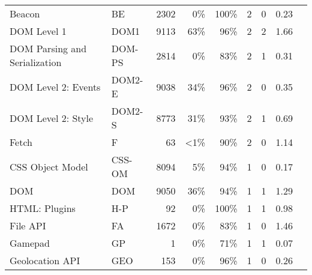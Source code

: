 \begin{table}[ht]
{\begin{tabular}{ l | l r r r | r r | r | l }
      Beacon                                              &  BE          & 2302  & 0\%          & 100\% & 2   & 0  & 0.23  & \\ %
      DOM Level 1                                         &  DOM1        & 9113  & 63\%         & 96\%  & 2   & 2  & 1.66  & \\ %
      DOM Parsing and Serialization                       &  DOM-PS      & 2814  & 0\%          & 83\%  & 2   & 1  & 0.31  & \\ %
      DOM Level 2: Events                                 &  DOM2-E      & 9038  & 34\%         & 96\%  & 2   & 0  & 0.35  & \\ %
      DOM Level 2: Style                                  &  DOM2-S      & 8773  & 31\%         & 93\%  & 2   & 1  & 0.69  & \\ %
      Fetch                                               &  F           & 63    & \textless1\% & 90\%  & 2   & 0  & 1.14  & \cite{van2016request,gelernter2015cross,van2015clock} \\ %
      CSS Object Model                                    &  CSS-OM      & 8094  & 5\%          & 94\%  & 1   & 0  & 0.17  & \cite{nikiforakis2013cookieless} \\ %
      DOM                                                 &  DOM         & 9050  & 36\%         & 94\%  & 1   & 1  & 1.29  & \\ %
      HTML: Plugins                                       &  H-P         & 92    & 0\%          & 100\% & 1   & 1  & 0.98  & \cite{alaca2016device,acar2013fpdetective} \\ %
      File API                                            &  FA          & 1672  & 0\%          & 83\%  & 1   & 0  & 1.46  & \\ %
      Gamepad                                             &  GP          & 1     & 0\%          & 71\%  & 1   & 1  & 0.07  & \\ %
      Geolocation API                                     &  GEO         & 153   & 0\%          & 96\%  & 1   & 0  & 0.26  & \cite{xu2015ucognito,kim2014exploring} \\ %

\end{tabular}}
\end{table}
